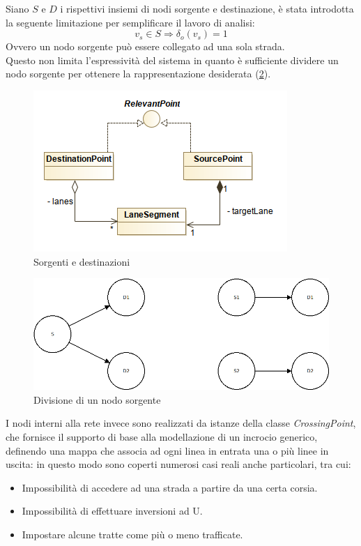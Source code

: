 Siano $S$ e $D$ i rispettivi insiemi di nodi sorgente e destinazione, è stata introdotta la seguente limitazione per semplificare il lavoro di analisi:
$$v_s \in S \Rightarrow \delta_o(v_s) = 1$$
Ovvero un nodo sorgente può essere collegato ad una sola strada.\\
Questo non limita l'espressività del sistema in quanto è sufficiente dividere un nodo sorgente per ottenere la rappresentazione desiderata (\ref{fig:graph00}).
\begin{figure}[h]
	\centering
	\includegraphics[scale=0.5]{img/model01}
	\caption{Sorgenti e destinazioni}
	\label{fig:model01}
\end{figure}

\begin{figure}[h]
	\centering
	\includegraphics[scale=0.5]{img/graph00}
	\caption{Divisione di un nodo sorgente}
	\label{fig:graph00}
\end{figure}

I nodi interni alla rete invece sono realizzati da istanze della classe \textit{CrossingPoint}, che fornisce il supporto di base alla modellazione di un incrocio generico, definendo una mappa che associa ad ogni linea in entrata una o più linee in uscita: in questo modo sono coperti numerosi casi reali anche particolari, tra cui:
\begin{itemize}
	\item Impossibilità di accedere ad una strada a partire da una certa corsia.
	\item Impossibilità di effettuare inversioni ad U.
	\item Impostare alcune tratte come più o meno trafficate.
\end{itemize}

